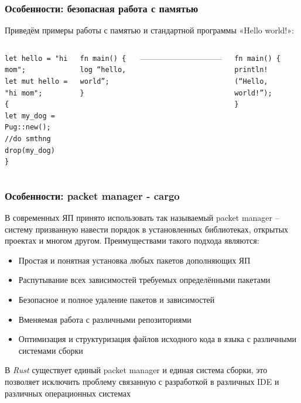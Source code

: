 \documentclass[11pt]{beamer}
\begin{document}
\begin{frame}[fragile]
\frametitle{Особенности: безопасная работа с памятью}
Приведём примеры работы с памятью и стандартной программы «Hello world!»:
\begin{columns} %
\begin{verbatim}
let hello = "hi mom"; 
let mut hello = "hi mom";
{
let my_dog = Pug::new();
//do smthng
drop(my_dog)
}
\end{verbatim}
\centering
{}
\begin{verbatim}
fn main() {
log “hello, world”;
}
\end{verbatim}
------------------------------
\begin{verbatim}
fn main() {
println!(“Hello, world!”);
}
\end{verbatim}
\centering
\end{columns}
\end{frame}
\begin{frame}
\frametitle{Особенности: {\color{orange}packet manager - cargo}}
В современных ЯП принято использовать так называемый {\color{orange}packet manager} – систему призванную навести порядок в установленных библиотеках, открытых проектах и многом другом. Преимуществами такого подхода являются:
\begin{itemize} 
    \item Простая и понятная установка любых пакетов дополняющих ЯП 
    \item Распутывание всех зависимостей требуемых определёнными пакетами
    \item Безопасное и полное удаление пакетов и зависимостей
    \item Вменяемая работа с различными репозиториями
    \item Оптимизация и структуризация файлов исходного кода в языка с различными системами сборки
\end{itemize}
В \textit{Rust} существует единый {\color{orange}packet manager} и единая система сборки, это позволяет исключить проблему связанную с разработкой в различных {\color{blue}IDE} и различных операционных системах
\end{frame}
\end{document}
